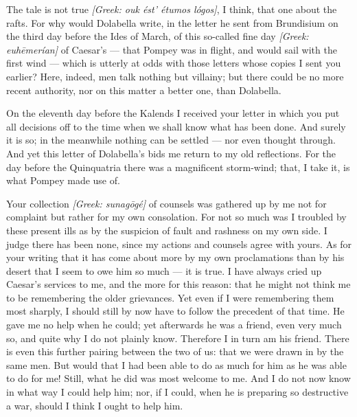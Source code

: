 

 The tale is not true \textit{[Greek: ouk \'est' \'etumos l\'ogos]}, I think, that one about the rafts. For why would Dolabella write, in the letter he sent from Brundisium on the third day before the Ides of March, of this so-called fine day \textit{[Greek: euh\=emer\'ian]} of Caesar's --- that Pompey was in flight, and would sail with the first wind --- which is utterly at odds with those letters whose copies I sent you earlier? Here, indeed, men talk nothing but villainy; but there could be no more recent authority, nor on this matter a better one, than Dolabella.

 On the eleventh day before the Kalends I received your letter in which you put all decisions off to the time when we shall know what has been done. And surely it is so; in the meanwhile nothing can be settled --- nor even thought through. And yet this letter of Dolabella's bids me return to my old reflections. For the day before the Quinquatria there was a magnificent storm-wind; that, I take it, is what Pompey made use of.

 Your collection \textit{[Greek: sunag\=og\'e]} of counsels was gathered up by me not for complaint but rather for my own consolation. For not so much was I troubled by these present ills as by the suspicion of fault and rashness on my own side. I judge there has been none, since my actions and counsels agree with yours. As for your writing that it has come about more by my own proclamations than by his desert that I seem to owe him so much --- it is true. I have always cried up Caesar's services to me, and the more for this reason: that he might not think me to be remembering the older grievances. Yet even if I were remembering them most sharply, I should still by now have to follow the precedent of that time. He gave me no help when he could; yet afterwards he was a friend, even very much so, and quite why I do not plainly know. Therefore I in turn am his friend. There is even this further pairing between the two of us: that we were drawn in by the same men. But would that I had been able to do as much for him as he was able to do for me! Still, what he did was most welcome to me. And I do not now know in what way I could help him; nor, if I could, when he is preparing so destructive a war, should I think I ought to help him.

